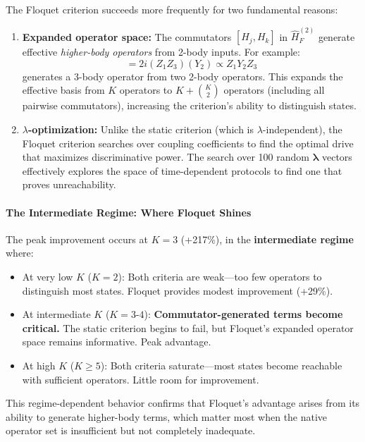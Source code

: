 The Floquet criterion succeeds more frequently for two fundamental reasons:

\begin{enumerate}
\item \textbf{Expanded operator space:} The commutators $[H_j, H_k]$ in $\hat{H}_F^{(2)}$ generate effective \emph{higher-body operators} from 2-body inputs. For example:
\begin{equation}
[Z_1 Z_2, Z_2 Z_3] = 2i (Z_1 Z_3) (Y_2) \propto Z_1 Y_2 Z_3
\end{equation}
generates a 3-body operator from two 2-body operators. This expands the effective basis from $K$ operators to $K + \binom{K}{2}$ operators (including all pairwise commutators), increasing the criterion's ability to distinguish states.

\item \textbf{$\lambda$-optimization:} Unlike the static criterion (which is $\lambda$-independent), the Floquet criterion searches over coupling coefficients to find the optimal drive that maximizes discriminative power. The search over 100 random $\boldsymbol{\lambda}$ vectors effectively explores the space of time-dependent protocols to find one that proves unreachability.
\end{enumerate}

\paragraph{The Intermediate Regime: Where Floquet Shines}

The peak improvement occurs at $K=3$ (+217\%), in the \textbf{intermediate regime} where:
\begin{itemize}
\item At very low $K$ ($K=2$): Both criteria are weak—too few operators to distinguish most states. Floquet provides modest improvement (+29\%).
\item At intermediate $K$ ($K=3$-$4$): \textbf{Commutator-generated terms become critical.} The static criterion begins to fail, but Floquet's expanded operator space remains informative. Peak advantage.
\item At high $K$ ($K \geq 5$): Both criteria saturate—most states become reachable with sufficient operators. Little room for improvement.
\end{itemize}

This regime-dependent behavior confirms that Floquet's advantage arises from its ability to generate higher-body terms, which matter most when the native operator set is insufficient but not completely inadequate.

